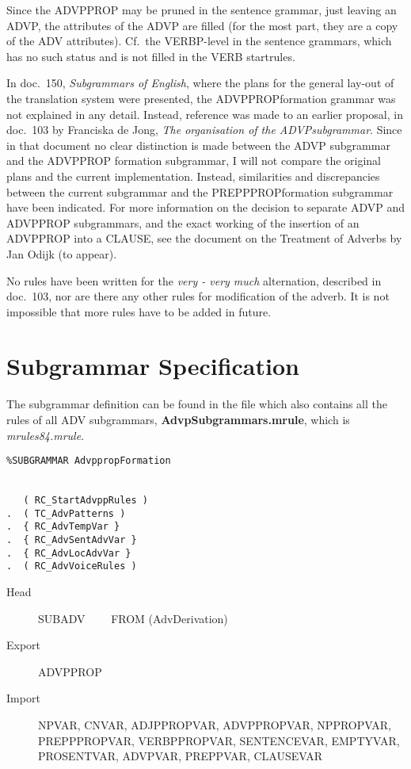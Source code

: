 Since the ADVPPROP may be pruned in the sentence grammar, just leaving an
ADVP, the attributes of the ADVP are filled (for the most part, they are a 
copy of the ADV attributes). Cf.\ the VERBP-level in the sentence grammars, 
which has no such status and is not filled in the VERB startrules.

In doc.\ 150, {\em Subgrammars of English\/}, where the plans for
the general lay-out of the translation system were presented, the 
ADVPPROPformation grammar was not explained in any detail. Instead, reference 
was made to an earlier proposal, in doc.\ 103 by Franciska 
de Jong, {\em The organisation of the ADVPsubgrammar\/}. Since in that document
no clear distinction is made between the ADVP subgrammar and the 
ADVPPROP formation
subgrammar, I will not compare the original plans and the current 
implementation. Instead, similarities and discrepancies between the current 
subgrammar and the PREPPPROPformation subgrammar have been indicated.
For more information on the decision to 
separate ADVP and ADVPPROP subgrammars, and the exact working of the insertion 
of an ADVPPROP into a CLAUSE, see the document on the Treatment of Adverbs by 
Jan Odijk (to appear).

No rules have been written for the {\em very - very much\/} alternation,
described in doc.\ 103, nor are there any other rules for modification of the 
adverb. It is not impossible that more rules have to be added in future.

\newpage
\section{Subgrammar Specification}
The subgrammar definition can be found in the file which also contains all the 
rules of all ADV subgrammars, {\bf AdvpSubgrammars.mrule}, 
which is {\em mrules84.mrule\/}.

\begin{verbatim}
%SUBGRAMMAR AdvppropFormation


   ( RC_StartAdvppRules )
.  ( TC_AdvPatterns )
.  { RC_AdvTempVar }
.  { RC_AdvSentAdvVar }
.  { RC_AdvLocAdvVar }
.  ( RC_AdvVoiceRules )

\end{verbatim}

\begin{description}
  \item[Head]  SUBADV  \ \ \ \ FROM (AdvDerivation)
  \item[Export] ADVPPROP
  \item[Import] NPVAR, CNVAR, ADJPPROPVAR, ADVPPROPVAR, NPPROPVAR, 
PREPPPROPVAR, VERBPPROPVAR, SENTENCEVAR, EMPTYVAR, PROSENTVAR, 
ADVPVAR, PREPPVAR, CLAUSEVAR
\end{description}

